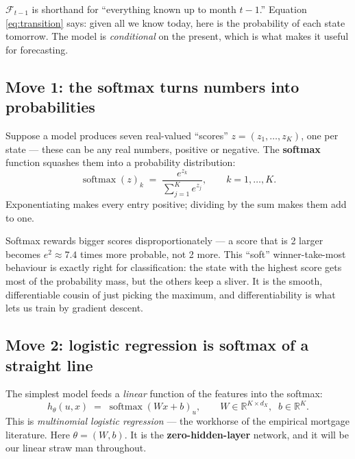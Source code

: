 \documentclass[11pt]{article}
\newcommand{\R}{\mathbb{R}}
\newcommand{\softmax}{\operatorname{softmax}}
\begin{document}
\begin{jargon}
$\mathcal{F}_{t-1}$ is shorthand for ``everything known up to month $t-1$.'' Equation
\eqref{eq:transition} says: given all we know today, here is the probability of each state
tomorrow. The model is \emph{conditional} on the present, which is what makes it useful
for forecasting.
\end{jargon}

\subsection{Move 1: the softmax turns numbers into probabilities}

Suppose a model produces seven real-valued ``scores'' $z = (z_1,\dots,z_K)$, one per state
--- these can be any real numbers, positive or negative. The \textbf{softmax} function
squashes them into a probability distribution:
\begin{equation}
  \softmax(z)_k \;=\; \frac{e^{z_k}}{\sum_{j=1}^{K} e^{z_j}},
  \qquad k = 1,\dots,K.
  \label{eq:softmax}
\end{equation}
Exponentiating makes every entry positive; dividing by the sum makes them add to one.

\begin{intuition}
Softmax rewards bigger scores disproportionately --- a score that is 2 larger becomes
$e^2 \approx 7.4$ times more probable, not 2 more. This ``soft'' winner-take-most behaviour
is exactly right for classification: the state with the highest score gets most of the
probability mass, but the others keep a sliver. It is the smooth, differentiable cousin of
just picking the maximum, and differentiability is what lets us train by gradient descent.
\end{intuition}

\subsection{Move 2: logistic regression is softmax of a straight line}

The simplest model feeds a \emph{linear} function of the features into the softmax:
\begin{equation}
  h_\theta(u, x) \;=\; \softmax\!\left(W x + b\right)_u,
  \qquad W \in \R^{K \times d_X},\;\; b \in \R^{K}.
  \label{eq:logreg}
\end{equation}
This is \emph{multinomial logistic regression} --- the workhorse of the empirical mortgage
literature. Here $\theta = (W, b)$. It is the \textbf{zero-hidden-layer} network, and it
will be our linear straw man throughout.
\end{document}
